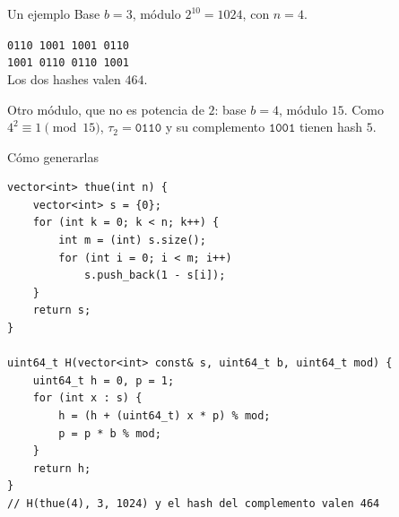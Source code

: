 \begin{frame}{Un ejemplo}
  Base \(b = 3\), módulo \(2^{10} = 1024\), con \(n = 4\).

  \begin{center}
  \texttt{0110 1001 1001 0110}\\[0.25em]
  \texttt{1001 0110 0110 1001}\\[0.7em]
  Los dos hashes valen \(464\).
  \end{center}

  \vspace{0.45em}
  Otro módulo, que no es potencia de \(2\): base \(b = 4\), módulo \(15\).
  Como \(4^{2} \equiv 1 \pmod{15}\), \(\tau_2 = \texttt{0110}\) y su complemento \(\texttt{1001}\) tienen hash \(5\).
\end{frame}

\begin{frame}[fragile]{Cómo generarlas}
\begin{lstlisting}
vector<int> thue(int n) {
    vector<int> s = {0};
    for (int k = 0; k < n; k++) {
        int m = (int) s.size();
        for (int i = 0; i < m; i++)
            s.push_back(1 - s[i]);
    }
    return s;
}

uint64_t H(vector<int> const& s, uint64_t b, uint64_t mod) {
    uint64_t h = 0, p = 1;
    for (int x : s) {
        h = (h + (uint64_t) x * p) % mod;
        p = p * b % mod;
    }
    return h;
}
// H(thue(4), 3, 1024) y el hash del complemento valen 464
\end{lstlisting}
\end{frame}
